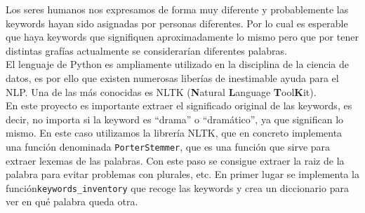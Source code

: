 Los seres humanos nos expresamos de forma muy diferente y probablemente las keywords hayan sido asignadas por personas diferentes. Por lo cual es esperable que haya keywords que signifiquen aproximadamente lo mismo pero que por tener distintas grafías actualmente se considerarían diferentes palabras.\\

El lenguaje de Python es ampliamente utilizado en la disciplina de la ciencia de datos, es por ello que existen numerosas liberías de inestimable ayuda para el NLP. Una de las más conocidas es NLTK \cite{NLTK} (\textbf{N}atural \textbf{L}anguage \textbf{T}ool\textbf{K}it).\\

En este proyecto es importante extraer el significado original de las keywords, es decir, no importa si la keyword es ``drama'' o ``dramático'', ya que significan lo mismo. En este caso utilizamos la librería NLTK, que en concreto implementa una función denominada \texttt{PorterStemmer}\cite{porter}, que es una función que sirve para extraer lexemas de las palabras. Con este paso se consigue extraer la raiz de la palabra para evitar problemas con plurales, etc. En primer lugar se implementa la función\texttt{keywords\_inventory} que recoge las keywords y crea un diccionario para ver en qué palabra queda otra.

